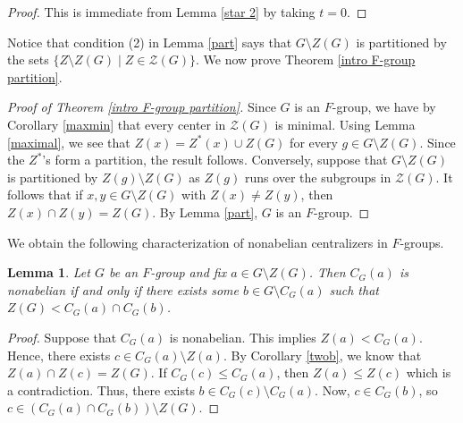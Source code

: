 \documentclass[12pt]{amsart}
\newtheorem{corollary}[theorem]{Corollary}
\newtheorem{lemma}[theorem]{Lemma}
\begin{document}
{\begin{proof}
This is immediate from Lemma \ref{star 2} by taking $t = 0$.  
\end{proof}

Notice that condition (2) in Lemma \ref{part} says that $G \setminus Z(G)$ is partitioned by the sets $\{ Z \setminus Z(G) \mid Z \in {\mathcal Z} (G) \}$.  We now prove Theorem \ref{intro F-group partition}.


\begin{proof}[Proof of Theorem \ref{intro F-group partition}]
Since $G$ is an $F$-group, we have by Corollary \ref{maxmin} that every center in $\mathcal {Z} (G)$ is minimal.  Using Lemma \ref{maximal}, we see that $Z (x) = Z^* (x) \cup Z(G)$ for every $g \in G \setminus Z(G)$.  Since the $Z^*$'s form a partition, the result follows.   Conversely, suppose that $G \setminus Z(G)$ is partitioned by $Z(g) \setminus Z(G)$ as $Z(g)$ runs over the subgroups in $\mathcal{Z} (G)$.	  It follows that if $x, y \in G \setminus Z(G)$ with $Z(x) \neq Z(y)$, then $Z(x) \cap Z(y) = Z(G)$.  By Lemma \ref{part}, $G$ is an $F$-group.
\end{proof}

We obtain the following characterization of nonabelian centralizers in $F$-groups.

\begin{lemma} \label{threeb}
Let $G$ be an $F$-group and fix $a \in G \setminus Z(G)$.  Then $C_G (a)$ is nonabelian if and only if there exists some $b \in G \setminus C_G (a)$ such that $Z(G) < C_G (a) \cap C_G (b)$.
\end{lemma}

\begin{proof}
Suppose that $C_G (a)$ is nonabelian.  This implies $Z (a) < C_G (a)$.  Hence, there exists $c \in C_G(a) \setminus Z(a)$.  By Corollary \ref{twob}, we know that $Z(a) \cap Z(c) = Z(G)$.  If $C_G (c) \le C_G(a)$, then $Z(a) \le Z(c)$ which is a contradiction.  Thus, there exists $b \in C_G (c) \setminus C_G (a)$.  Now, $c \in C_G(b)$, so $c \in (C_G (a) \cap C_G (b)) \setminus Z(G)$.
	

\end{proof}}
\end{document}
